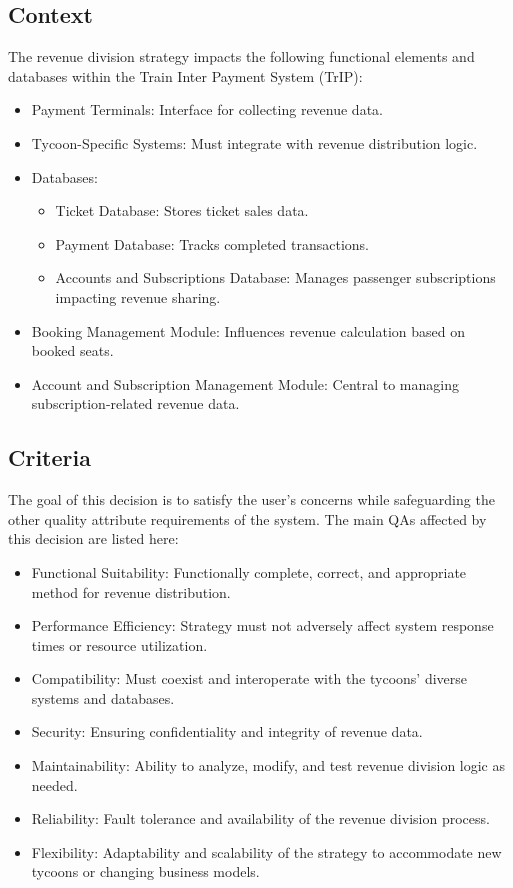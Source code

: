 \subsection*{Context}
The revenue division strategy impacts the following functional elements and databases within the Train Inter Payment System (TrIP):
\begin{itemize}
    \item Payment Terminals: Interface for collecting revenue data.
    \item Tycoon-Specific Systems: Must integrate with revenue distribution logic.
    \item Databases:
    \begin{itemize}
        \item Ticket Database: Stores ticket sales data.
        \item Payment Database: Tracks completed transactions.
        \item Accounts and Subscriptions Database: Manages passenger subscriptions impacting revenue sharing.
    \end{itemize}
    \item Booking Management Module: Influences revenue calculation based on booked seats.
    \item Account and Subscription Management Module: Central to managing subscription-related revenue data.
\end{itemize}

\subsection*{Criteria}
The goal of this decision is to satisfy the user's concerns while safeguarding the other quality attribute requirements of the system. The main QAs affected by this decision are listed here:
\begin{itemize}
    \item Functional Suitability: Functionally complete, correct, and appropriate method for revenue distribution.
    \item Performance Efficiency: Strategy must not adversely affect system response times or resource utilization.
    \item Compatibility: Must coexist and interoperate with the tycoons' diverse systems and databases.
    \item Security: Ensuring confidentiality and integrity of revenue data.
    \item Maintainability: Ability to analyze, modify, and test revenue division logic as needed.
    \item Reliability: Fault tolerance and availability of the revenue division process.
    \item Flexibility: Adaptability and scalability of the strategy to accommodate new tycoons or changing business models.
\end{itemize}

